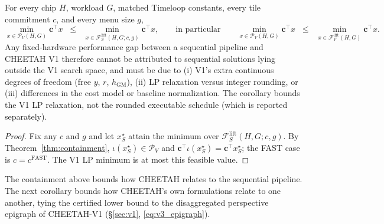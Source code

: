 \begin{corollary}
\label{cor:optimum}
For every chip $H$, workload $G$, matched Timeloop constants, every tile
commitment $c$, and every menu size $g$,
$$
\min_{x \in \mathcal{P}_V(H,G)}\!\!\mathbf{c}^\top x \;\;\le\;\;
\min_{x \in \mathcal{F}_S^{\mathrm{lift}}(H,G;c,g)}\!\!\mathbf{c}^\top x,
\qquad\text{in particular}\qquad
\min_{x \in \mathcal{P}_V(H,G)}\!\!\mathbf{c}^\top x \;\;\le\;\;
\min_{x \in \mathcal{F}_F^{\mathrm{lift}}(H,G)}\!\!\mathbf{c}^\top x.
$$
Any fixed-hardware performance gap between a sequential pipeline and CHEETAH
V1 therefore cannot be attributed to sequential solutions lying outside the V1
search space, and must be due to (i) V1's extra continuous degrees of freedom
(free $y$, $r$, $h_{\mathrm{GM}}$), (ii) LP relaxation versus integer rounding,
or (iii) differences in the cost model or baseline normalization.
The corollary bounds the V1 LP relaxation, not the rounded executable schedule
(which is reported separately).
\end{corollary}
\begin{proof}
Fix any $c$ and $g$ and let $x_S^\star$ attain the minimum over $\mathcal{F}_S^{\mathrm{lift}}(H,G;c,g)$. By Theorem~\ref{thm:containment},
$\iota(x_S^\star) \in \mathcal{P}_V$ and $\mathbf{c}^\top \iota(x_S^\star) = \mathbf{c}^\top x_S^\star$; the FAST case is $c = c^{\mathrm{FAST}}$.
The V1 LP minimum is at most this feasible value.
\end{proof}

The containment above bounds how CHEETAH relates to the sequential pipeline. The
next corollary bounds how CHEETAH's own formulations relate to one another,
tying the certified lower bound to the disaggregated perspective epigraph of
CHEETAH-V1 (\S\ref{sec:v1}, \eqref{eq:v3_epigraph}).

